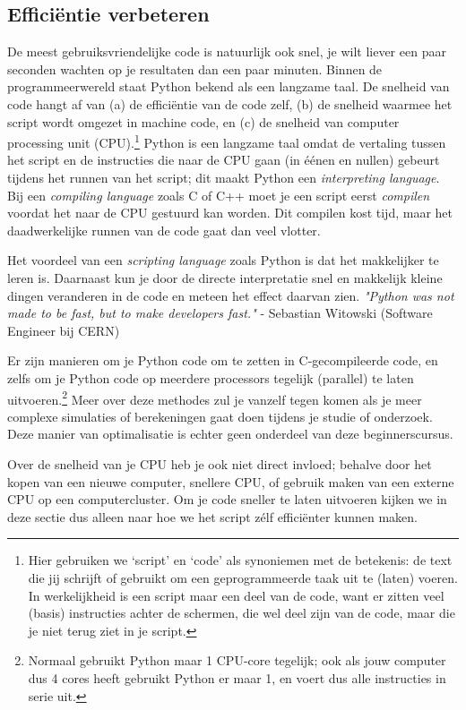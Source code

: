 \documentclass[a4paper,11pt, fleqn]{article}
\begin{document}
\subsection{Effici\"entie verbeteren}
De meest gebruiksvriendelijke code is natuurlijk ook snel, je wilt liever een paar seconden wachten op je resultaten dan een paar minuten. Binnen de programmeerwereld staat Python bekend als een langzame taal. De snelheid van code hangt af van (a) de effici\"entie van de code zelf, (b) de snelheid waarmee het script wordt omgezet in machine code, en (c) de snelheid van computer processing unit (CPU).\footnote{Hier gebruiken we `script' en `code' als synoniemen met de betekenis: de text die jij schrijft of gebruikt om een geprogrammeerde taak uit te (laten) voeren. In werkelijkheid is een script maar een deel van de code, want er zitten veel (basis) instructies achter de schermen, die wel deel zijn van de code, maar die je niet terug ziet in je script.} Python is een langzame taal omdat de vertaling tussen het script en de instructies die naar de CPU gaan (in \'e\'enen en nullen) gebeurt tijdens het runnen van het script; dit maakt Python een \textit{interpreting language}. Bij een \textit{compiling language} zoals C of C++ moet je een script eerst \textit{compilen} voordat het naar de CPU gestuurd kan worden. Dit compilen kost tijd, maar het daadwerkelijke runnen van de code gaat dan veel vlotter.

Het voordeel van een \textit{scripting language} zoals Python is dat het makkelijker te leren is. Daarnaast kun je door de directe interpretatie snel en makkelijk kleine dingen veranderen in de code en meteen het effect daarvan zien. \textit{"Python was not made to be fast, but to make developers fast."} - Sebastian Witowski (Software Engineer bij CERN)

Er zijn manieren om je Python code om te zetten in C-gecompileerde code, en zelfs om je Python code op meerdere processors tegelijk (parallel) te laten uitvoeren.\footnote{Normaal gebruikt Python maar 1 CPU-core tegelijk; ook als jouw computer dus 4 cores heeft gebruikt Python er maar 1, en voert dus alle instructies in serie uit.} Meer over deze methodes zul je vanzelf tegen komen als je meer complexe simulaties of berekeningen gaat doen tijdens je studie of onderzoek. Deze manier van optimalisatie is echter geen onderdeel van deze beginnerscursus.

Over de snelheid van je CPU heb je ook niet direct invloed; behalve door het kopen van een nieuwe computer, snellere CPU, of gebruik maken van een externe CPU op een computercluster. Om je code sneller te laten uitvoeren kijken we in deze sectie dus alleen naar hoe we het script z\'elf effici\"enter kunnen maken.
\end{document}
